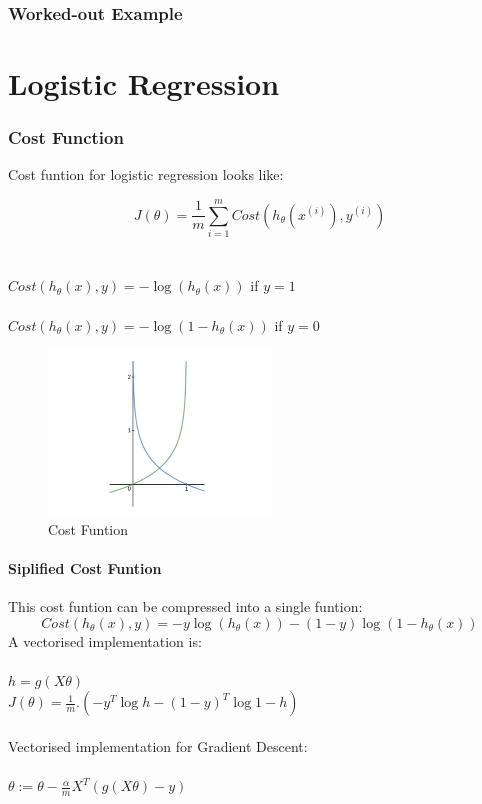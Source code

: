 \documentclass[12pt, A4]{report}
\begin{document}
  \subsection{Worked-out Example}
	

\chapter{Logistic Regression}

  \subsection{Cost Function}
    Cost funtion for logistic regression looks like:

    \begin{equation}
      J(\theta) = \frac{1}{m}\sum_{i=1}^{m}Cost(h_\theta(x^{(i)}), y^{(i)})
    \end{equation}
    \\ \\
    $ Cost(h_\theta(x),y) = -\log{(h_\theta{(x)})} $ \hfill if $y = 1$
    \\ \\
    $Cost(h_\theta(x),y) = -\log{(1-h_\theta{(x)})}$  \hfill if $y = 0$

    \begin{figure}[h]
      \centering
      \includegraphics[scale = 0.75]{costlog.png}
      \caption{Cost Funtion}
    \end{figure}

    \subsubsection{Siplified Cost Funtion}
    This cost funtion can be compressed into a single funtion:
    \begin{equation}
      Cost(h_\theta(x),y) = -y\log{(h_\theta{(x)})} -(1-y)\log{(1-h_\theta{(x)})}
    \end{equation}
    A vectorised implementation is: \\ \\
    $h = g(X\theta)$\\
    $J(\theta) = \frac{1}{m}.(-y^T\log{h}-(1-y)^T\log{1-h})$
    \\ \\
    Vectorised implementation for Gradient Descent: \\ \\
    $\theta := \theta - \frac{\alpha}{m}X^T(g(X\theta)-y)$
\end{document}
